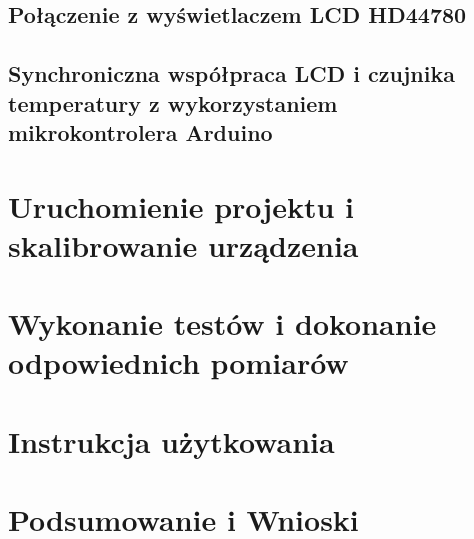     \section{Połączenie z wyświetlaczem LCD HD44780}
    \section{Synchroniczna współpraca LCD i czujnika temperatury z wykorzystaniem mikrokontrolera Arduino}
\chapter{Uruchomienie projektu i skalibrowanie urządzenia}
\chapter{Wykonanie testów i dokonanie odpowiednich pomiarów}
\chapter{Instrukcja użytkowania}
\chapter{Podsumowanie i Wnioski}